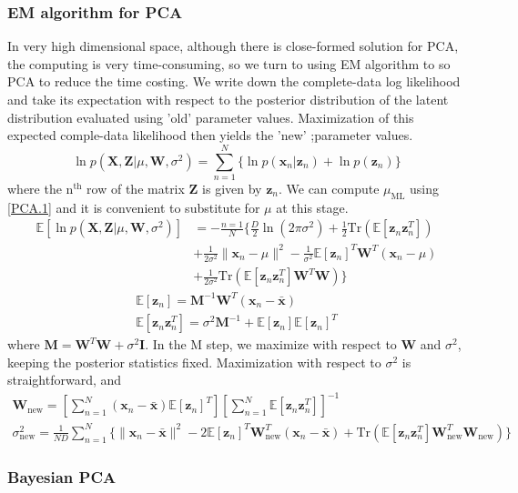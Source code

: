 \documentclass[a4paper]{book}
\newcommand{\mrm}{\mathrm}
\newcommand{\mbf}{\mathbf}
\newcommand{\bb}{\mathbb}
\newcommand{\XX}{\mbf X}
\newcommand{\ZZ}{\mbf Z}
\newcommand{\WW}{\mbf W}
\newcommand{\MM}{\mbf M}
\newcommand{\II}{\mbf I}
\newcommand{\xx}{\mbf x}
\newcommand{\zz}{\mbf z}
\newcommand{\Exp}{\mathbb{E}}
\begin{document}
\subsubsection*{EM algorithm for PCA}
In very high dimensional space, although there is close-formed solution for PCA, the computing is very time-consuming, so we turn to using EM algorithm to so PCA to reduce the time costing. \newline
We write down the complete-data log likelihood and take its expectation with respect to the posterior distribution of the latent distribution evaluated using 'old' parameter values. Maximization of this expected comple-data likelihood then yields the 'new' ;parameter values.
\begin{equation}\label{}
  \ln p(\XX,\ZZ|\mu, \WW,\sigma^2) = \sum_{n=1}^{N}\{\ln p(\xx_n|\zz_n)+\ln p(\zz_n)\}
\end{equation}
where the $\mrm n^{\mrm{th}}$ row of the matrix $\ZZ$ is given by $\zz_n$. We can compute $\mu_{\mrm{ML}}$ using \ref{PCA.1} and it is convenient to substitute for $\mu$ at this stage.
\begin{align}\label{}
  \mathbb{E} [\ln p(\XX,\ZZ|\mu,\WW,\sigma^2)] & = -\frac{n=1}{N}\{\frac{D}{2}\ln(2\pi\sigma^2)+\frac12\mrm{Tr}(\mathbb{E}[\zz_n\zz_n^T]) \\
  & +\frac{1}{2\sigma^2}\|\xx_n-\mu\|^2-\frac{1}{\sigma^2}\mathbb{E}[\zz_n]^T\WW^T(\xx_n-\mu) \\
  & + \frac{1}{2\sigma^2}\mrm{Tr}(\mathbb{E}[\zz_n\zz_n^T]\WW^T\WW)\}
\end{align}\label{}
\begin{gather}\label{}
  \mathbb{E}[\zz_n] = \MM^{-1}\WW^T(\xx_n-\bar{\xx}) \\
  \bb{E}[\zz_n\zz_n^T] = \sigma^2\MM^{-1}+\bb{E}[\zz_n]\bb{E}[\zz_n]^T
\end{gather}
where $\MM = \WW^T\WW+\sigma^2\II$.
In the M step, we maximize with respect to $\WW$ and $\sigma^2$, keeping the posterior statistics fixed. Maximization with respect to $\sigma^2$ is straightforward, and
\begin{gather}\label{}
  \WW_{\mrm{new}} = [\sum_{n=1}^{N}(\xx_n-\bar{\xx})\bb{E}[\zz_n]^T][\sum_{n=1}^{N}\Exp[\zz_n\zz_n^T]]^{-1}  \\
  \sigma^2_{\mrm{new}} = \frac{1}{ND}\sum_{n=1}^{N}\{\|\xx_n-\bar{\xx}\|^2-2\Exp[\zz_n]^T\WW_{\mrm{new}}^T(\xx_n-\bar{\xx})+\mrm{Tr}(\Exp[\zz_n\zz_n^T]\WW_{\mrm{new}}^T\WW_{\mrm{new}}) \}
\end{gather}
\subsubsection*{Bayesian PCA}
\end{document}
